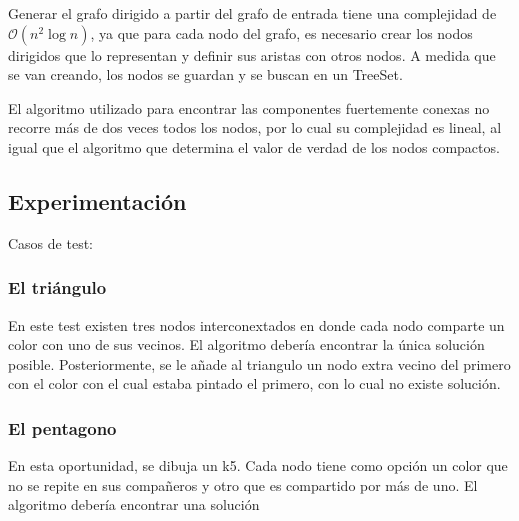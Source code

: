 Generar el grafo dirigido a partir del grafo de entrada tiene una complejidad de $\mathcal{O}(n^2\log{n})$, ya que para cada nodo del grafo, es necesario crear los nodos dirigidos que lo representan y definir sus aristas con otros nodos. A medida que se van creando, los nodos se guardan y se buscan en un TreeSet.

El algoritmo utilizado para encontrar las componentes fuertemente conexas no recorre más de dos veces todos los nodos, por lo cual su complejidad es lineal, al igual que el algoritmo que determina el valor de verdad de los nodos compactos.


% 
% 

\subsection{Experimentación}
Casos de test:
\subsubsection{El triángulo}
En este test existen tres nodos interconextados en donde cada nodo comparte un color con uno de sus vecinos. El algoritmo debería encontrar la única solución posible.
Posteriormente, se le añade al triangulo un nodo extra vecino del primero con el color con el cual estaba pintado el primero, con lo cual no existe solución.
\subsubsection{El pentagono}
En esta oportunidad, se dibuja un k5. Cada nodo tiene como opción un color que no se repite en sus compañeros y otro que es compartido por más de uno. El algoritmo debería encontrar una solución

